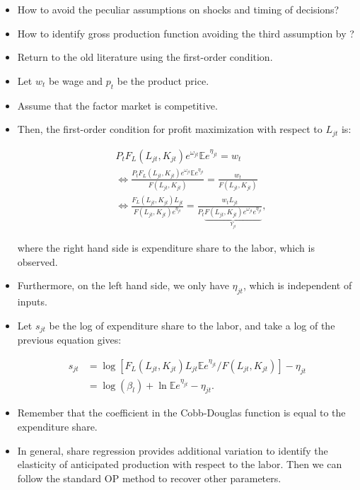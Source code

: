 \documentclass[]{book}
\theoremstyle{definition}
\theoremstyle{definition}
\theoremstyle{definition}
\theoremstyle{remark}
\begin{document}
\begin{itemize}
\item
  How to avoid the peculiar assumptions on shocks and timing of
  decisions?
\item
  How to identify gross production function avoiding the third
  assumption by \citet{Ackerberg2015}?
\item
  Return to the old literature using the first-order condition.
\item
  Let \(w_t\) be wage and \(p_t\) be the product price.
\item
  Assume that the factor market is competitive.
\item
  Then, the first-order condition for profit maximization with respect
  to \(L_{jt}\) is:

  \begin{equation}
  \begin{split}
  &P_t F_L(L_{jt}, K_{jt})e^{\omega_{jt}} \mathbb{E} e^{\eta_{jt}} = w_t\\
  &\Leftrightarrow \frac{P_t F_L(L_{jt}, K_{jt})e^{\omega_{jt}} \mathbb{E} e^{\eta_{jt}}}{F(L_{jt}, K_{jt}) } = \frac{w_t}{F(L_{jt}, K_{jt}) }\\
  &\Leftrightarrow \frac{F_L(L_{jt}, K_{jt}) L_{jt}}{F(L_{jt}, K_{jt})  e^{\eta_{jt}} } = \frac{w_t L_{jt}}{P_t \underbrace{F(L_{jt}, K_{jt}) e^{\omega_{jt}} e^{\eta_{jt}}}_{Y_{jt}} },
  \end{split}
  \end{equation}

  where the right hand side is expenditure share to the labor, which is
  observed.
\item
  Furthermore, on the left hand side, we only have \(\eta_{jt}\), which
  is independent of inputs.
\item
  Let \(s_{jt}\) be the log of expenditure share to the labor, and take
  a log of the previous equation gives:

  \begin{equation}
  \begin{split}
  s_{jt} &= \log [F_L(L_{jt}, K_{jt}) L_{jt} \mathbb{E} e^{\eta_{jt}} / F(L_{jt}, K_{jt})] - \eta_{jt}\\
  & = \log(\beta_l) + \ln \mathbb{E} e^{\eta_{jt}} - \eta_{jt}.
  \end{split}
  \end{equation}
\item
  Remember that the coefficient in the Cobb-Douglas function is equal to
  the expenditure share.
\item
  In general, share regression provides additional variation to identify
  the elasticity of anticipated production with respect to the labor.
  Then we can follow the standard OP method to recover other parameters.
\end{itemize}
\end{document}
